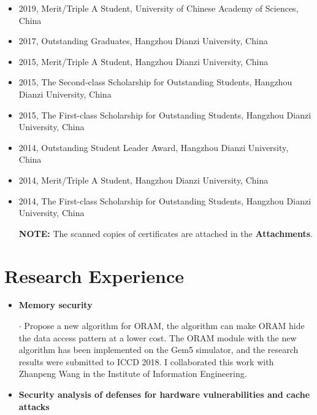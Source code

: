 \documentclass[11pt]{article}
\begin{document}
{\begin{itemize}
	\item 2019, Merit/Triple A Student, University of Chinese Academy of Sciences, China
	\item 2017, Outstanding Graduates, Hangzhou Dianzi University, China
	\item 2015, Merit/Triple A Student, Hangzhou Dianzi University, China
	\item 2015, The Second-class Scholarship for Outstanding Students, Hangzhou Dianzi University, China
	\item 2015, The First-class Scholarship for Outstanding Students, Hangzhou Dianzi University, China
	\item 2014, Outstanding Student Leader Award, Hangzhou Dianzi University, China
	\item 2014, Merit/Triple A Student, Hangzhou Dianzi University, China
	\item 2014, The First-class Scholarship for Outstanding Students, Hangzhou Dianzi University, China
	
	{\bf NOTE:} The scanned copies of certificates are attached in the \textbf{Attachments}.
\end{itemize}


\section*{Research Experience}

\begin{itemize}

\item {\bf Memory security}\\
\vspace{-.3cm}

$\cdot$ Propose a new algorithm for ORAM, the algorithm can make ORAM hide the data access pattern at a lower cost. The ORAM module with the new algorithm has been implemented on the Gem5 simulator, and the research results were submitted to ICCD 2018. I collaborated this work with Zhanpeng Wang in the Institute of Information Engineering. 
\end{itemize}

\begin{itemize}
\vspace{-.3cm}

\item {\bf Security analysis of defenses for hardware vulnerabilities and cache attacks}\\
\vspace{-.3cm}


\end{itemize}}
\end{document}
